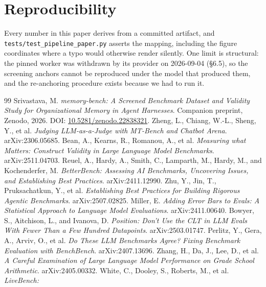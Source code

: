 \documentclass[11pt]{article}
\newcommand{\code}[1]{\texttt{\small #1}}
\newcommand{\companionDOI}{10.5281/zenodo.22838321}
\begin{document}
\section*{Reproducibility}
Every number in this paper derives from a committed artifact, and
\code{tests/test\_\allowbreak pipeline\_\allowbreak paper.py} asserts the mapping,
including the figure
coordinates where a typo would otherwise render silently. One limit is
structural: the pinned worker was withdrawn by its provider on 2026-09-04
(\S6.5), so the screening anchors cannot be reproduced under the model that
produced them, and the re-anchoring procedure exists because we had to run it.

\begin{thebibliography}{99}
\footnotesize
\setlength{\itemsep}{0pt}\setlength{\parsep}{0pt}
 Srivastava, M. \emph{memory-bench: A Screened Benchmark
Dataset and Validity Study for Organizational Memory in Agent Harnesses}.
Companion preprint, Zenodo, 2026.
DOI: \href{https://doi.org/\companionDOI}{\companionDOI}.
 Zheng, L., Chiang, W.-L., Sheng, Y., et al. \emph{Judging
LLM-as-a-Judge with MT-Bench and Chatbot Arena}. arXiv:2306.05685.
 Bean, A., Kearns, R., Romanou, A., et al. \emph{Measuring
what Matters: Construct Validity in Large Language Model Benchmarks}.
arXiv:2511.04703.
 Reuel, A., Hardy, A., Smith, C., Lamparth, M., Hardy, M.,
and Kochenderfer, M. \emph{BetterBench: Assessing AI Benchmarks, Uncovering
Issues, and Establishing Best Practices}. arXiv:2411.12990.
 Zhu, Y., Jin, T., Pruksachatkun, Y., et al. \emph{Establishing
Best Practices for Building Rigorous Agentic Benchmarks}. arXiv:2507.02825.
 Miller, E. \emph{Adding Error Bars to Evals: A Statistical
Approach to Language Model Evaluations}. arXiv:2411.00640.
 Bowyer, S., Aitchison, L., and Ivanova, D. \emph{Position:
Don't Use the CLT in LLM Evals With Fewer Than a Few Hundred Datapoints}.
arXiv:2503.01747.
 Perlitz, Y., Gera, A., Arviv, O., et al. \emph{Do These
LLM Benchmarks Agree? Fixing Benchmark Evaluation with BenchBench}.
arXiv:2407.13696.
 Zhang, H., Da, J., Lee, D., et al. \emph{A Careful Examination
of Large Language Model Performance on Grade School Arithmetic}.
arXiv:2405.00332.
 White, C., Dooley, S., Roberts, M., et al. \emph{LiveBench:
}
\end{thebibliography}
\end{document}
